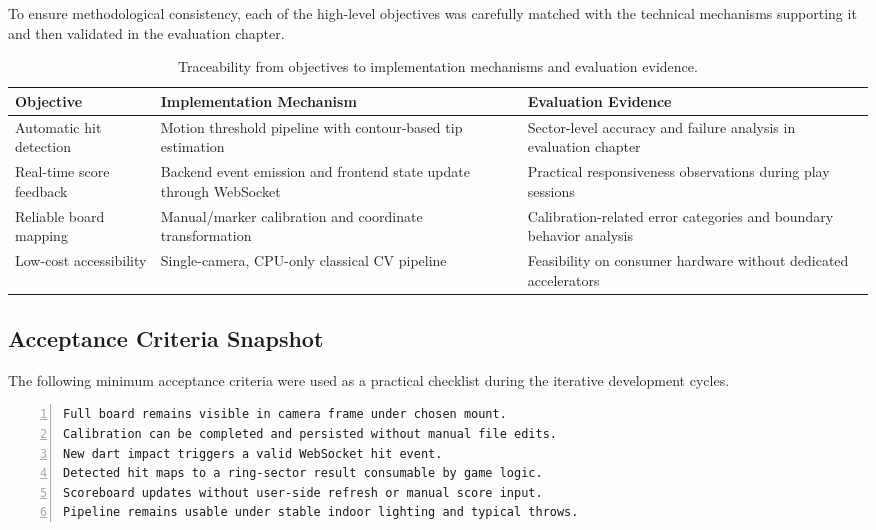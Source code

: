 To ensure methodological consistency, each of the high-level objectives was carefully matched with the technical mechanisms supporting it and then validated in the evaluation chapter.

\begin{table}[H]
    \centering
    \begin{tabularx}{\linewidth}{@{}X X X@{}}
        \toprule
        \textbf{Objective} & \textbf{Implementation Mechanism} & \textbf{Evaluation Evidence} \\
        \midrule
        Automatic hit detection & Motion threshold pipeline with contour-based tip estimation & Sector-level accuracy and failure analysis in evaluation chapter \\
        Real-time score feedback & Backend event emission and frontend state update through WebSocket & Practical responsiveness observations during play sessions \\
        Reliable board mapping & Manual/marker calibration and coordinate transformation & Calibration-related error categories and boundary behavior analysis \\
        Low-cost accessibility & Single-camera, CPU-only classical CV pipeline & Feasibility on consumer hardware without dedicated accelerators \\
        \bottomrule
    \end{tabularx}
    \caption{Traceability from objectives to implementation mechanisms and evaluation evidence.}
    \label{tab:objective_traceability}
\end{table}

\subsection{Acceptance Criteria Snapshot}

The following minimum acceptance criteria were used as a practical checklist during the iterative development cycles.

\begin{lstlisting}[numbers=left,caption=Practical acceptance checklist used during iterative testing, label=lst:acceptance_checklist]
Full board remains visible in camera frame under chosen mount.
Calibration can be completed and persisted without manual file edits.
New dart impact triggers a valid WebSocket hit event.
Detected hit maps to a ring-sector result consumable by game logic.
Scoreboard updates without user-side refresh or manual score input.
Pipeline remains usable under stable indoor lighting and typical throws.
\end{lstlisting}